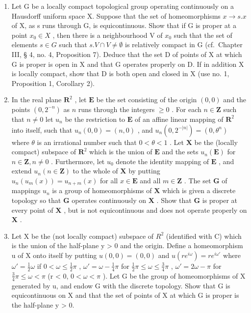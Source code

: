 \begin{enumerate}
\def\labelenumi{\alph{enumi})}
\item
  Let G be a locally compact topological group operating continuously on a Hausdorff uniform space X. Suppose that the set of homeomorphisms \(x \rightarrow s.x\) of X, as s runs through G, is equicontinuous. Show that if G is proper at a point \(x_{0} \in X\) , then there is a neighbourhood V of \(x_{0}\) such that the set of elements \(s \in G\) such that \(s.V \cap V \neq \emptyset\) is relatively compact in G (cf.~Chapter III, § 4, no. 4, Proposition 7). Deduce that the set D of points of X at which G is proper is open in X and that G operates properly on D. If in addition X is locally compact, show that D is both open and closed in X (use no. 1, Proposition 1, Corollary 2).
\item
  In the real plane \(\mathbf{R}^2\) , let \(\mathbf{E}\) be the set consisting of the origin \((0,0)\) and the points \((0,2^{-n})\) as \(n\) runs through the integers \(\geqslant 0\) . For each \(n\in \mathbf{Z}\) such that \(n\neq 0\) let \(u_{n}\) be the restriction to \(\mathbf{E}\) of an affine linear mapping of \(\mathbf{R}^2\) into itself, such that \(u_{n}(0,0) = (n,0)\) , and \(u_{n}(0,2^{-|n|}) = (0,\theta^{n})\) where \(\theta\) is an irrational number such that \(0 <   \theta <  1\) . Let \(\mathbf{X}\) be the (locally compact) subspace of \(\mathbf{R}^2\) which is the union of \(\mathbf{E}\) and the sets \(u_{n}(\mathbf{E})\) for \(n\in \mathbf{Z},n\neq 0\) . Furthermore, let \(u_{0}\) denote the identity mapping of \(\mathbf{E}\) , and extend \(u_{n}(n\in \mathbf{Z})\) to the whole of \(\mathbf{X}\) by putting \(u_{n}(u_{m}(x)) = u_{n + m}(x)\) for all \(x\in \mathbf{E}\) and all \(m\in \mathbf{Z}\) . The set \(\mathbf{G}\) of mappings \(u_{n}\) is a group of homeomorphisms of \(\mathbf{X}\) which is given a discrete topology so that \(\mathbf{G}\) operates continuously on \(\mathbf{X}\) . Show that \(\mathbf{G}\) is proper at every point of \(\mathbf{X}\) , but is not equicontinuous and does not operate properly on \(\mathbf{X}\) .
\item
  Let X be the (not locally compact) subspace of \(R^{2}\) (identified with C) which is the union of the half-plane y \textgreater{} 0 and the origin. Define a homeomorphism u of X onto itself by putting \(u(0, 0) = (0, 0)\) and \(u(re^{i\omega}) = re^{i\omega'}\) where \(\omega' = \frac{1}{2}\omega\) if \(0 < \omega \leqslant \frac{1}{2}\pi\) , \(\omega' = \omega - \frac{1}{4}\pi\) for \(\frac{1}{2}\pi \leqslant \omega \leqslant \frac{3}{4}\pi\) , \(\omega' = 2\omega - \pi\) for \(\frac{3}{4}\pi \leqslant \omega < \pi\) (r \textless{} 0, \(0 < \omega < \pi\) ). Let G be the group of homeomorphisms of X generated by u, and endow G with the discrete topology. Show that G is equicontinuous on X and that the set of points of X at which G is proper is the half-plane y \textgreater{} 0.
\end{enumerate}

